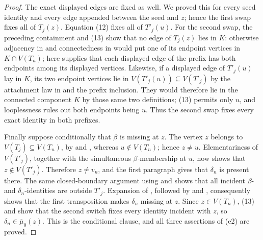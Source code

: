 \begin{proof}
The exact displayed edges are fixed as well.  We proved this for every
seed identity and every edge appended between the seed and \(z\); hence
the first swap fixes all of \(T_j(z)\).  Equation (12) fixes all of
\(T'_j(u)\).  For the second swap, the preceding containment and (13) show
that no edge of \(T_j(z)\) lies in \(K\): otherwise adjacency in
 and connectedness in
 would put one of its endpoint vertices in
\(K\cap V(T_n)\); here  supplies that each displayed
edge of the prefix has both endpoints among its displayed vertices.
Likewise, if a displayed edge of \(T'_j(u)\) lay in \(K\), its two endpoint
vertices lie in \(V(T'_j(u))\subseteq V(T'_j)\) by the attachment law in
 and the prefix inclusion.  They would therefore lie
in the connected component \(K\) by those same two definitions; (13)
permits only \(u\), and
looplessness rules out both endpoints being \(u\).  Thus the second swap
fixes every exact identity in both prefixes.

Finally suppose conditionally that \(\beta\) is missing at \(z\).  The
vertex \(z\) belongs to \(V(T_j)\subseteq V(T_n)\), by
 and
, whereas \(u\notin V(T_n)\); hence
\(z\ne u\).  Elementariness of \(V(T'_j)\), together with the simultaneous
\(\beta\)-membership at \(u\), now shows that \(z\notin V(T'_j)\).
Therefore \(z\ne v_n\), and the first paragraph gives that \(\delta_n\)
is present there.  The same closed-boundary argument using
 and  shows that
all incident \(\beta\)- and \(\delta_n\)-identities are outside \(T'_j\).
Expansion of , followed by
 and , consequently shows
that the first transposition makes \(\delta_n\) missing at \(z\).
Since \(z\in V(T_n)\), (13) and  show that the
second switch fixes every identity incident with \(z\), so
\(\delta_n\in\overline\mu_0(z)\).  This is the conditional clause, and all
three assertions of (e2) are proved.
\end{proof}
